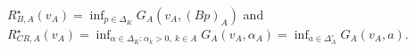 \(R_{B,A}^\star(v_A)=\inf_{p\in\Delta_K}G_A(v_A,(Bp)_A)\) and \(R_{CR,A}^\star(v_A)=\inf_{\alpha\in\Delta_K:\alpha_k>0,\ k\in A}G_A(v_A,\alpha_A)=\inf_{a\in\Delta_A^\circ}G_A(v_A,a)\).